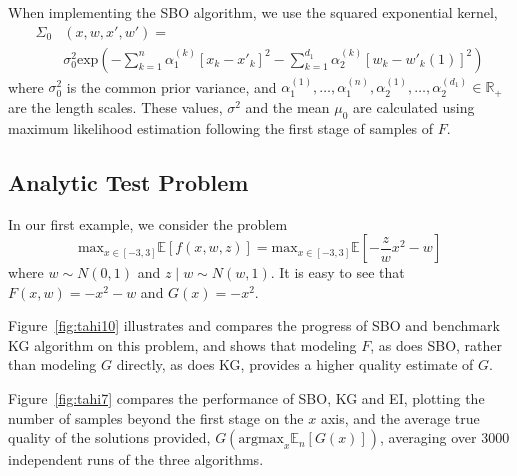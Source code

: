 \documentclass{article}
\newcommand{\w}{w}
\newcommand{\z}{z}
\newcommand{\pfcomment}[1]{{\color{red} PF: #1}}
\begin{document}
When implementing the SBO algorithm, we use the squared exponential kernel,
\begin{align*}
\Sigma_{0}&\left(x,\w,x',\w'\right)=\\  
&\sigma_{0}^{2}\mbox{exp}\left(-\sum_{k=1}^{n}\alpha_{1}^{\left(k\right)}\left[x_{k}-x'_{k}\right]^{2}-\sum_{k=1}^{d_{1}}\alpha_{2}^{\left(k\right)}\left[\w_{k}-\w'_{k}\left(1\right)\right]^{2}\right)
\end{align*}
where $\sigma_{0}^{2}$ is the common prior variance, and $\alpha_{1}^{\left(1\right)},\ldots,\alpha_{1}^{\left(n\right)},\alpha_{2}^{\left(1\right)},\ldots,\alpha_{2}^{\left(d_{1}\right)}\in\mathbb{R}_{+}$
are the length scales. These values, $\sigma^{2}$ and the mean $\mu_{0}$ are calculated using maximum likelihood estimation following the first stage of samples of $F$.

\subsection{Analytic Test Problem}
\label{sec:test}
In our first example, we consider the problem
\[
\mbox{max}_{x\in\left[-3,3\right]}\mathbb{E}\left[f\left(x,\w,\z\right)\right]=\mbox{max}_{x\in\left[-3,3\right]}\mathbb{E}\left[-\frac{\z}{\w}x^{2}-\w\right]
\]
where $\w\sim N\left(0,1\right)$ and $\z\mid \w\sim N\left(\w,1\right)$. It is easy to see that $F\left(x,\w \right)=-x^{2}-\w$ and $G(x)=-x^{2}$.

Figure~\ref{fig:tahi10} illustrates and compares the progress of SBO and benchmark KG algorithm on this problem, and shows that modeling $F$, as does SBO, rather than modeling $G$ directly, as does KG, provides a higher quality estimate of $G$.

Figure~\ref{fig:tahi7} compares the performance of SBO, KG and EI, plotting the number of samples beyond the first stage on the $x$ axis, and the average true quality of the solutions provided, $G(\mathrm{argmax}_x \mathbb{E}_n[G(x)])$, averaging over 3000 independent runs of the three algorithms.



\[
\]
\end{document}
